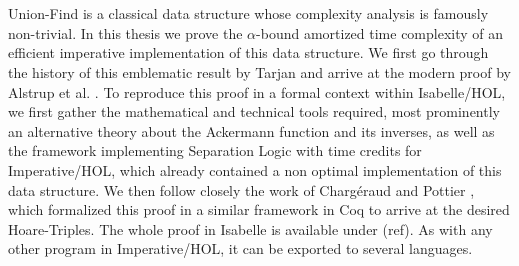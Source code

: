 \chapter{\abstractname}

Union-Find is a classical data structure whose complexity analysis is famously non-trivial. In this thesis we prove the $\alpha$-bound amortized time complexity of an efficient imperative implementation of this data structure. We first go through the history of this emblematic result by Tarjan \cite{Tarjan1975b} and arrive at the modern proof by Alstrup et al. \cite{Alstrup14}.
To reproduce this proof in a formal context within Isabelle/HOL, we first gather the mathematical and technical tools required, most prominently an alternative theory about the Ackermann function and its inverses, as well as the framework implementing Separation Logic with time credits for Imperative/HOL, which already contained a non optimal implementation of this data structure.
We then follow closely the work of Chargéraud and Pottier \cite{chargueraud17}, which formalized this proof in a similar framework in Coq to arrive at the desired Hoare-Triples. The whole proof in Isabelle is available under (ref). As with any other program in Imperative/HOL, it can be exported to several languages.

